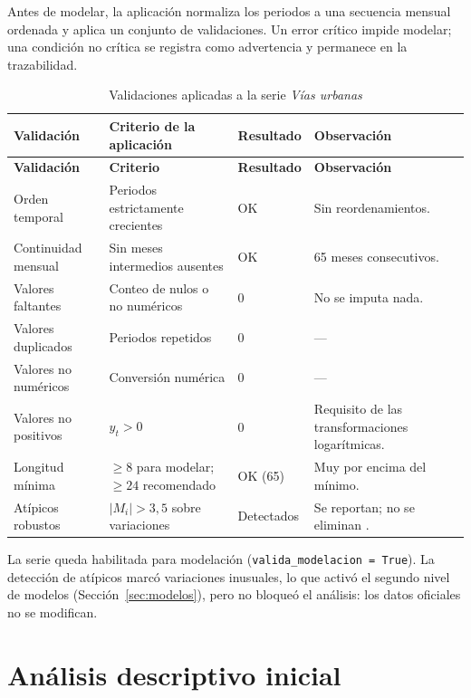 \documentclass[11pt,letterpaper]{article}
\begin{document}
Antes de modelar, la aplicación normaliza los periodos a una secuencia mensual
ordenada y aplica un conjunto de validaciones. Un error crítico impide modelar;
una condición no crítica se registra como advertencia y permanece en la
trazabilidad.

\begin{longtable}{@{}p{3.4cm}p{5.6cm}p{2.4cm}p{4.0cm}@{}}
\caption{Validaciones aplicadas a la serie \textit{Vías urbanas}}\\
\toprule
\textbf{Validación} & \textbf{Criterio de la aplicación} & \textbf{Resultado} & \textbf{Observación} \\
\midrule
\endfirsthead
\toprule
\textbf{Validación} & \textbf{Criterio} & \textbf{Resultado} & \textbf{Observación} \\
\midrule
\endhead
Orden temporal & Periodos estrictamente crecientes & OK & Sin reordenamientos. \\
Continuidad mensual & Sin meses intermedios ausentes & OK & 65 meses consecutivos. \\
Valores faltantes & Conteo de nulos o no numéricos & 0 & No se imputa nada. \\
Valores duplicados & Periodos repetidos & 0 & --- \\
Valores no numéricos & Conversión numérica & 0 & --- \\
Valores no positivos & \(y_t>0\) & 0 & Requisito de las transformaciones logarítmicas. \\
Longitud mínima & \(\geq 8\) para modelar; \(\geq 24\) recomendado & OK (65) & Muy por encima del mínimo. \\
Atípicos robustos & \(|M_i|>3{,}5\) sobre variaciones & Detectados & Se reportan; no se eliminan \cite{nist_outliers}. \\
\bottomrule
\end{longtable}

La serie queda habilitada para modelación (\texttt{valida\_modelacion = True}).
La detección de atípicos marcó variaciones inusuales, lo que activó el
segundo nivel de modelos (Sección~\ref{sec:modelos}), pero no bloqueó el
análisis: los datos oficiales no se modifican.

\section{Análisis descriptivo inicial}
\end{document}

